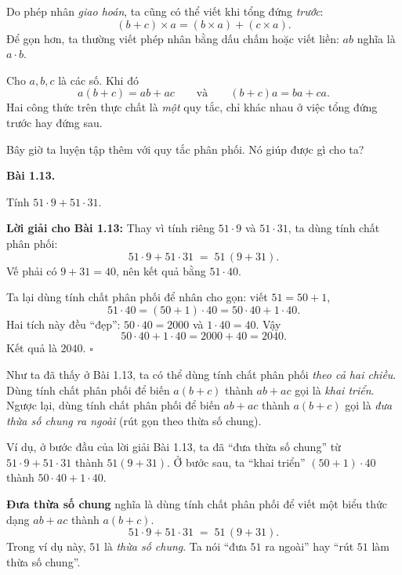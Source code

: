 \documentclass[14pt,a4paper]{extbook}
\newenvironment{problem}[1][]{
  \par\noindent\textbf{Bài #1.}\ \ignorespaces
}{\par}
\begin{document}
Do phép nhân \emph{giao hoán}, ta cũng có thể viết khi tổng đứng \emph{trước}:
\[
(b+c)\times a=(b\times a)+(c\times a).
\]
Để gọn hơn, ta thường viết phép nhân bằng dấu chấm hoặc viết liền:
\(ab\) nghĩa là \(a\cdot b\).

\begin{tcolorbox}[colback=yellow!10, colframe=orange!80!black,
title={Quan trọng: Phép nhân \emph{phân phối} qua phép cộng}]
Cho \(a,b,c\) là các số. Khi đó
\[
a(b+c)=ab+ac
\qquad\text{và}\qquad
(b+c)a=ba+ca.
\]
Hai công thức trên thực chất là \emph{một} quy tắc, chỉ khác nhau ở việc
tổng đứng trước hay đứng sau.
\end{tcolorbox}

Bây giờ ta luyện tập thêm với quy tắc phân phối. Nó giúp được gì cho ta?

\begin{problem}[1.13]
Tính \(51\cdot9 + 51\cdot31\).
\end{problem}

\noindent\textbf{Lời giải cho Bài 1.13:}
Thay vì tính riêng \(51\cdot9\) và \(51\cdot31\), ta dùng tính chất phân phối:
\[
51\cdot9 + 51\cdot31 \;=\; 51\,(9+31).
\]
Vế phải có \(9+31=40\), nên kết quả bằng \(51\cdot40\).

Ta lại dùng tính chất phân phối để nhân cho gọn: viết \(51=50+1\),
\[
51\cdot40=(50+1)\cdot40=50\cdot40+1\cdot40.
\]
Hai tích này đều “đẹp”: \(50\cdot40=2000\) và \(1\cdot40=40\).
Vậy
\[
50\cdot40+1\cdot40=2000+40=2040.
\]
Kết quả là \(\boxed{2040}\). \(\square\)


Như ta đã thấy ở Bài 1.13, ta có thể dùng tính chất phân phối
\emph{theo cả hai chiều}. Dùng tính chất phân phối để biến
\(a(b+c)\) thành \(ab+ac\) gọi là \emph{khai triển}. Ngược lại, dùng
tính chất phân phối để biến \(ab+ac\) thành \(a(b+c)\) gọi là
\emph{đưa thừa số chung ra ngoài} (rút gọn theo thừa số chung).

Ví dụ, ở bước đầu của lời giải Bài 1.13, ta đã “đưa thừa số chung”
từ \(51\cdot9+51\cdot31\) thành \(51(9+31)\).
Ở bước sau, ta “khai triển” \((50+1)\cdot40\) thành \(50\cdot40+1\cdot40\).

\begin{tcolorbox}[colback=blue!3,colframe=blue!60!black,title={Góc ý tưởng: Đưa thừa số chung}]
\textbf{Đưa thừa số chung} nghĩa là dùng tính chất phân phối để viết
một biểu thức dạng \(ab+ac\) thành \(a(b+c)\).
\[
51\cdot9+51\cdot31 \;=\; 51\,(9+31).
\]
Trong ví dụ này, \(51\) là \emph{thừa số chung}. Ta nói “đưa \(51\) ra
ngoài” hay “rút \(51\) làm thừa số chung”.
\end{tcolorbox}
\end{document}
